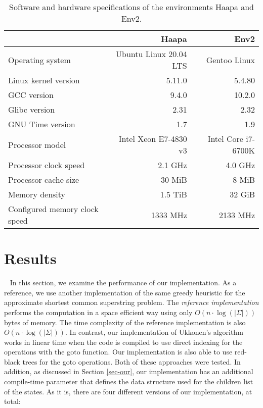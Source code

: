 \documentclass[english,twoside,censored,csm,algorithms-track-2020]{HYthesisML}
\theoremstyle{plain}
\theoremstyle{definition}
\begin{document}
\begin{table}
\begin{tabular}{l|r|r}
  & \textbf{Haapa} & \textbf{Env2} \\
  \hline
  Operating system & Ubuntu Linux 20.04 LTS & Gentoo Linux \footnotemark \\
  Linux kernel version & 5.11.0 & 5.4.80 \\
  GCC version & 9.4.0 & 10.2.0 \\
  Glibc version & 2.31 & 2.32 \\
  GNU Time version & 1.7 & 1.9 \\
  \hline
  Processor model & Intel Xeon E7-4830 v3 & Intel Core i7-6700K \\
  Processor clock speed & 2.1 GHz & 4.0 GHz \\
  Processor cache size & 30 MiB & 8 MiB \\
  Memory density & 1.5 TiB & 32 GiB \\
  Configured memory clock speed & 1333 MHz & 2133 MHz \\
\end{tabular}
\caption{Software and hardware specifications of the environments Haapa and Env2.}
\label{tbl-sys}
\end{table}




\section{Results}~\label{sec-results}
In this section, we examine the performance of our implementation. As a reference, we use another
implementation of the same greedy heuristic for the approximate shortest common superstring problem.
The {\em reference implementation} \citep{Alanko17} performs the computation in a space efficient way using
only $O(n \cdot\log(|\Sigma|))$ bytes of memory. The time complexity of the reference implementation
is also $O(n \cdot\log(|\Sigma|))$. In contrast, our implementation of Ukkonen's algorithm
works in linear time when the code is compiled to use direct indexing for the operations with
the goto function. Our implementation is also able to use red-black trees for the goto
operations. Both of these approaches were tested.
In addition, as discussed in Section
\ref{sec-our}, our implementation has an additional compile-time parameter that defines the data
structure used for the children list of the states. As it is, there are four different versions of
our implementation, at total:
\end{document}
